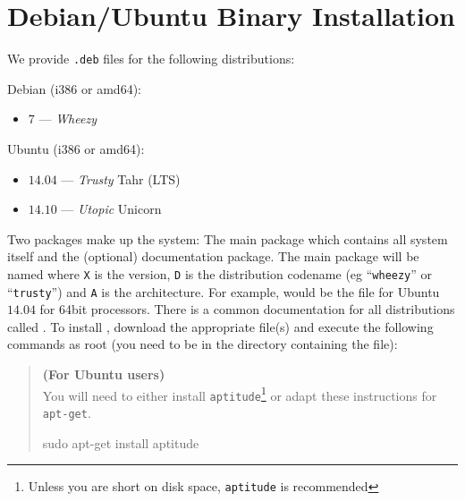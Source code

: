 %
%
%



\chapter{Debian/Ubuntu Binary Installation}\label{chap:bin}

We provide \texttt{.deb} files for the following distributions:

Debian (i386 or amd64):
\begin{itemize}
 \item $7$ --- \emph{Wheezy}
\end{itemize}

Ubuntu (i386 or amd64):
\begin{itemize}
 \item $14.04$ --- \emph{Trusty} Tahr (LTS)
 \item $14.10$ --- \emph{Utopic} Unicorn 
\end{itemize}

Two packages make up the \escript system:
The main package which contains all system itself and the (optional) documentation package.
The main package will be named  where \texttt{X} is the version, \texttt{D} 
is the distribution codename (eg ``\texttt{wheezy}'' or ``\texttt{trusty}'') and \texttt{A} is the architecture.
For example,  would be the file for Ubuntu $14.04$ for 64bit processors.
There is a common documentation for all distributions called .
To install \esfinley, download the appropriate  file(s) and execute the following 
commands as root (you need to be in the directory containing the file):

\begin{verse}
\textbf{(For Ubuntu users)}\\
You will need to either install \texttt{aptitude}\footnote{Unless you are short on disk space, \texttt{aptitude} 
is recommended} or adapt these instructions for \texttt{apt-get}.
\begin{shellCode}
sudo apt-get install aptitude
\end{shellCode}
\end{verse}

